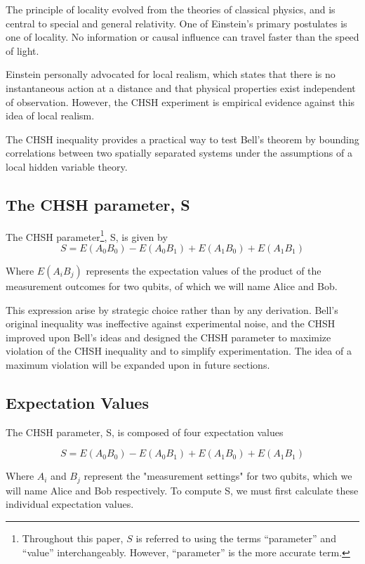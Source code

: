 \documentclass[12pt]{article}
\begin{document}
The principle of locality evolved from the theories of classical physics, and is central to special and general relativity. One of Einstein's primary postulates is one of locality. No information or causal influence can travel faster than the speed of light.

Einstein personally advocated for local realism, which states that there is no instantaneous action at a distance and that physical properties exist independent of observation. However, the CHSH experiment is empirical evidence against this idea of local realism.

The CHSH inequality provides a practical way to test Bell's theorem by bounding correlations between two spatially separated systems under the assumptions of a local hidden variable theory. \cite{CHSH1969}

\subsection{The CHSH parameter, S}

The CHSH parameter\footnote{Throughout this paper, \( S \) is referred to using the terms ``parameter'' and ``value'' interchangeably. However, ``parameter'' is the more accurate term.}, S, is given by
$$
S = E(A_0 B_0) - E(A_0 B_1) + E(A_1 B_0) + E(A_1 B_1)
$$

Where $E(A_i B_j)$ represents the expectation values of the product of the measurement outcomes for two qubits, of which we will name Alice and Bob.

This expression arise by strategic choice rather than by any derivation. Bell's original inequality was ineffective against experimental noise, and the CHSH improved upon Bell's ideas and designed the CHSH parameter to maximize violation of the CHSH inequality and to simplify experimentation. \cite{CHSH1969} The idea of a maximum violation will be expanded upon in future sections. 


\subsection{Expectation Values}

The CHSH parameter, S, is composed of four expectation values

$$
S = E(A_0 B_0) - E(A_0 B_1) + E(A_1 B_0) + E(A_1 B_1)
$$

Where $A_i$ and $B_j$ represent the "measurement settings" for two qubits, which we will name Alice and Bob respectively. To compute S, we must first calculate these individual expectation values.
\end{document}
